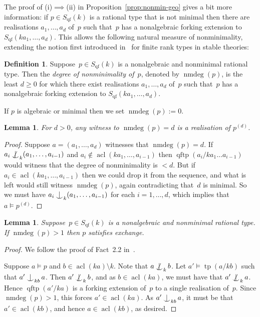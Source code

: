 \documentclass[\DocOpts]{amsart}
\newtheorem{lemma}[theorem]{Lemma}
\theoremstyle{definition}
\newtheorem{definition}[theorem]{Definition}
\def\tp{\operatorname{tp}}
\def\qftp{\operatorname{qftp}}
\def\qf{\operatorname{qf}}
\def\acl{\operatorname{acl}}
\def\nmdeg{\operatorname{nmdeg}}
\newcommand{\<}{\langle}
\renewcommand{\>}{\rangle}
\def\Ind#1#2{#1\setbox0=\hbox{\(#1x\)}\kern\wd0\hbox to 
0pt{\hss\(#1\mid\)\hss}\lower.9\ht0\hbox to 
0pt{\hss\(#1\smile\)\hss}\kern\wd0}
\def\ind{\mathop{\mathpalette\Ind{}}}
\def\notind#1#2{#1\setbox0=\hbox{\(#1x\)}\kern\wd0\hbox to 
0pt{\mathchardef\nn=12854\hss\(#1\nn\)\kern1.4\wd0\hss}\hbox to 
0pt{\hss\(#1\mid\)\hss}\lower.9\ht0 \hbox to 
0pt{\hss\(#1\smile\)\hss}\kern\wd0}
\def\nind{\mathop{\mathpalette\notind{}}}
\begin{document}
The proof of (i)$\implies$(ii) in Proposition~\ref{prop:nonmin-geo} gives a bit more information:
if $p\in S_{\qf}(k)$ is a rational type that is not minimal then there are realisations $a_1,\dots,a_d$ of~$p$ such that~$p$ has a nonalgebraic forking extension to $S_{\qf}(ka_1,\dots,a_d)$.
This allows the following natural measure of nonminimality, extending the notion first introduced in~\cite{nmdeg} for finite rank types in stable theories:

\begin{definition}\label{def:nmdeg}
Suppose~$p\in S_{\qf}(k)$ is a nonalgebraic and nonminimal rational type.
Then the \emph{degree of nonminimality of~$p$}, denoted by $\nmdeg(p)$, is 
the least $d\geq 0$ for which there exist realisations $a_1,\dots,a_d$ of~$p$ 
such that~$p$ has a nonalgebraic forking extension to $S_{\qf}(ka_1,\dots,a_d)$.

If $p$ is algebraic or minimal then we set $\nmdeg(p):=0$.
\end{definition}

\begin{lemma}
\label{morley}
For $d>0$, any witness to $\nmdeg(p)=d$ is a realisation of $p^{(d)}$.
\end{lemma}

\begin{proof}
Suppose $a=(a_1,\dots,a_d)$ witnesses that $\nmdeg(p)=d$.
If $a_i\nind_k(a_1,\dots,a_{i-1})$ and $a_i\notin\acl(ka_1,\dots,a_{i-1})$ then  $\qftp(a_i/ka_1\dots a_{i-1})$ would witness that the degree of nonminimality is $<d$.
But if $a_i\in\acl(ka_1,\dots,a_{i-1})$ then we could drop it from the sequence, and what is left would still witness $\nmdeg(p)$, again contradicting that~$d$ is minimal.
So we must have $a_i\ind_k(a_1,\dots,a_{i-1})$ for each $i=1,\dots, d$, which implies that $a\models p^{(d)}$.
\end{proof}

\begin{lemma}\label{lem:exchange}
Suppose~$p\in S_{\qf}(k)$ is a nonalgebraic and nonminimal rational type.
If $\nmdeg(p)>1$ then $p$ satisfies exchange.
\end{lemma}

\begin{proof}
We follow the proof of Fact~2.2 in~\cite{nmdeg2}.

Suppose $a\models p$ and $b\in\acl(ka)\setminus k$.
Note that $a\nind_kb$.
Let $a'\models\tp(a/kb)$ such that $a'\ind_{kb}a$.
Then $a'\nind_k{b}$, and as $b\in\acl(ka)$, we must have that $a'\nind_ka$.
Hence $\qftp(a'/ka)$ is a forking extension of~$p$ to a single realisation of~$p$.
Since $\nmdeg(p)>1$, this forces $a'\in\acl(ka)$.
As $a'\ind_{kb}a$, it must be that $a'\in\acl(kb)$, and hence $a\in\acl(kb)$, as desired.
\end{proof}
\end{document}
